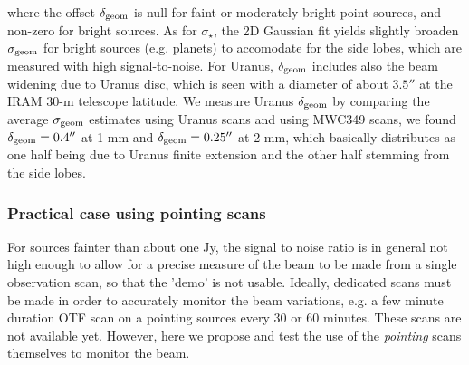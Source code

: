 where the offset $\delta_{\rm{geom}}$ is null for faint or moderately
bright point sources, and non-zero for bright sources.
As for $\sigma_\star$,  the 2D Gaussian fit yields slightly broaden
$\sigma_{\rm{geom}}$ for bright sources (e.g. planets) to accomodate
for the side lobes, which are measured with high signal-to-noise.
For Uranus, $\delta_{\rm{geom}}$ includes also the beam widening due
to Uranus disc, which is seen with a diameter of about $3.5''$ at the
IRAM 30-m telescope latitude. We measure Uranus $\delta_{\rm{geom}}$
by comparing the average $\sigma_{\rm{geom}}$ estimates using Uranus
scans and using MWC349 scans, we found $\delta_{\rm{geom}} = 0.4''$ at
1-mm and $\delta_{\rm{geom}} = 0.25''$ at 2-mm, which basically
distributes as one half being due to Uranus finite extension and the
other half stemming from the side lobes. 


\subsubsection{Practical case using pointing scans}
\label{se:photocorr_pointing}

For sources fainter than about one Jy, the signal to noise ratio is in
general not high enough to allow for a precise measure of the beam to be
made from a single observation scan, so that the 'demo' is not
usable. Ideally, dedicated scans must be made in order to accurately
monitor the beam variations, e.g. a few minute duration OTF scan on a
pointing sources every 30 or 60 minutes. These scans are not available
yet. However, here we propose and test the use of the \emph{pointing} scans
themselves to monitor the beam.

